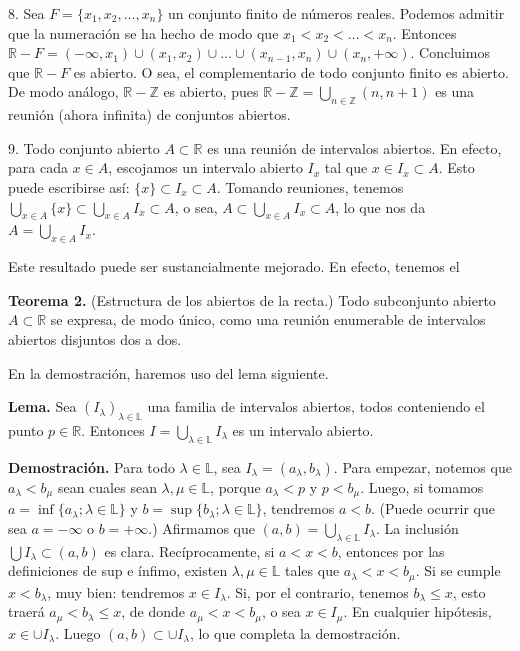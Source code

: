 \documentclass[12pt,oneside]{book}
\begin{document}
8. Sea \(F = \{x_1, x_2, \dots, x_n\}\) un conjunto finito de números reales. Podemos admitir que la numeración se ha hecho de modo que \(x_1 < x_2 < \dots < x_n\). Entonces \(\mathbb{R} - F = (-\infty, x_1) \cup (x_1, x_2) \cup \dots \cup (x_{n-1}, x_n) \cup (x_n, +\infty)\). Concluimos que \(\mathbb{R} - F\) es abierto. O sea, el complementario de todo conjunto finito es abierto. De modo análogo, \(\mathbb{R} - \mathbb{Z}\) es abierto, pues \(\mathbb{R} - \mathbb{Z} = \bigcup_{n \in \mathbb{Z}} (n, n+1)\) es una reunión (ahora infinita) de conjuntos abiertos.

9. Todo conjunto abierto \(A \subset \mathbb{R}\) es una reunión de intervalos abiertos. En efecto, para cada \(x \in A\), escojamos un intervalo abierto \(I_x\) tal que \(x \in I_x \subset A\). Esto puede escribirse así: \(\{x\} \subset I_x \subset A\). Tomando reuniones, tenemos \(\bigcup_{x \in A} \{x\} \subset \bigcup_{x \in A} I_x \subset A\), o sea, \(A \subset \bigcup_{x \in A} I_x \subset A\), lo que nos da \(A = \bigcup_{x \in A} I_x\).

Este resultado puede ser sustancialmente mejorado. En efecto, tenemos el

\textbf{Teorema 2.} (Estructura de los abiertos de la recta.) Todo subconjunto abierto \(A \subset \mathbb{R}\) se expresa, de modo único, como una reunión enumerable de intervalos abiertos disjuntos dos a dos.

En la demostración, haremos uso del lema siguiente.

\textbf{Lema.} Sea \((I_\lambda)_{\lambda \in \mathbb{L}}\) una familia de intervalos abiertos, todos conteniendo el punto \(p \in \mathbb{R}\). Entonces \(I = \bigcup_{\lambda \in \mathbb{L}} I_\lambda\) es un intervalo abierto.

\textbf{Demostración.} Para todo \(\lambda \in \mathbb{L}\), sea \(I_\lambda = (a_\lambda, b_\lambda)\). Para empezar, notemos que \(a_\lambda < b_\mu\) sean cuales sean \(\lambda, \mu \in \mathbb{L}\), porque \(a_\lambda < p\) y \(p < b_\mu\). Luego, si tomamos \(a = \inf\{a_\lambda; \lambda \in \mathbb{L}\}\) y \(b = \sup\{b_\lambda; \lambda \in \mathbb{L}\}\), tendremos \(a < b\). (Puede ocurrir que sea \(a = -\infty\) o \(b = +\infty\).) Afirmamos que \((a, b) = \bigcup_{\lambda \in \mathbb{L}} I_\lambda\). La inclusión \(\bigcup I_\lambda \subset (a, b)\) es clara. Recíprocamente, si \(a < x < b\), entonces por las definiciones de sup e ínfimo, existen \(\lambda, \mu \in \mathbb{L}\) tales que \(a_\lambda < x < b_\mu\). Si se cumple \(x < b_\lambda\), muy bien: tendremos \(x \in I_\lambda\). Si, por el contrario, tenemos \(b_\lambda \leq x\), esto traerá \(a_\mu < b_\lambda \leq x\), de donde \(a_\mu < x < b_\mu\), o sea \(x \in I_\mu\). En cualquier hipótesis, \(x \in \cup I_\lambda\). Luego \((a, b) \subset \cup I_\lambda\), lo que completa la demostración.
\end{document}

